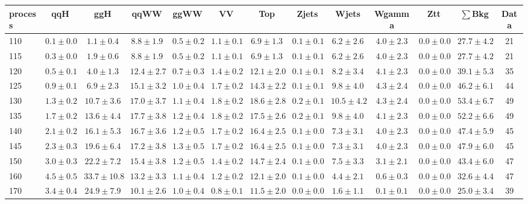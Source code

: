 \begin{table}
{%
 \tiny
 \begin{center}
 \begin{tabular}{l | c c | c c c c c c c c  | c c}
 \hline
 process & qqH & ggH & qqWW & ggWW & VV & Top & Zjets & Wjets & Wgamma & Ztt & $\sum$Bkg & Data \\
 \hline
110 & $0.1\pm0.0$ & $1.1\pm0.4$ & $8.8\pm1.9$ & $0.5\pm0.2$ & $1.1\pm0.1$ & $6.9\pm1.3$ & $0.1\pm0.1$ & $6.2\pm2.6$ & $4.0\pm2.3$ & $0.0\pm0.0$ & $27.7\pm4.2$ & 21 \\
115 & $0.3\pm0.0$ & $1.9\pm0.6$ & $8.8\pm1.9$ & $0.5\pm0.2$ & $1.1\pm0.1$ & $6.9\pm1.3$ & $0.1\pm0.1$ & $6.2\pm2.6$ & $4.0\pm2.3$ & $0.0\pm0.0$ & $27.7\pm4.2$ & 21 \\
120 & $0.5\pm0.1$ & $4.0\pm1.3$ & $12.4\pm2.7$ & $0.7\pm0.3$ & $1.4\pm0.2$ & $12.1\pm2.0$ & $0.1\pm0.1$ & $8.2\pm3.4$ & $4.1\pm2.3$ & $0.0\pm0.0$ & $39.1\pm5.3$ & 35 \\
125 & $0.9\pm0.1$ & $6.9\pm2.3$ & $15.1\pm3.2$ & $1.0\pm0.4$ & $1.7\pm0.2$ & $14.3\pm2.2$ & $0.1\pm0.1$ & $9.8\pm4.0$ & $4.3\pm2.4$ & $0.0\pm0.0$ & $46.2\pm6.1$ & 44 \\
130 & $1.3\pm0.2$ & $10.7\pm3.6$ & $17.0\pm3.7$ & $1.1\pm0.4$ & $1.8\pm0.2$ & $18.6\pm2.8$ & $0.2\pm0.1$ & $10.5\pm4.2$ & $4.3\pm2.4$ & $0.0\pm0.0$ & $53.4\pm6.7$ & 49 \\
135 & $1.7\pm0.2$ & $13.6\pm4.4$ & $17.7\pm3.8$ & $1.2\pm0.4$ & $1.8\pm0.2$ & $17.5\pm2.6$ & $0.2\pm0.1$ & $9.8\pm4.0$ & $4.1\pm2.3$ & $0.0\pm0.0$ & $52.2\pm6.6$ & 49 \\
140 & $2.1\pm0.2$ & $16.1\pm5.3$ & $16.7\pm3.6$ & $1.2\pm0.5$ & $1.7\pm0.2$ & $16.4\pm2.5$ & $0.1\pm0.0$ & $7.3\pm3.1$ & $4.0\pm2.3$ & $0.0\pm0.0$ & $47.4\pm5.9$ & 45 \\
145 & $2.3\pm0.3$ & $19.6\pm6.4$ & $17.2\pm3.8$ & $1.3\pm0.5$ & $1.7\pm0.2$ & $16.4\pm2.5$ & $0.1\pm0.0$ & $7.3\pm3.1$ & $4.0\pm2.3$ & $0.0\pm0.0$ & $47.9\pm6.0$ & 45 \\
150 & $3.0\pm0.3$ & $22.2\pm7.2$ & $15.4\pm3.8$ & $1.2\pm0.5$ & $1.4\pm0.2$ & $14.7\pm2.4$ & $0.1\pm0.0$ & $7.5\pm3.3$ & $3.1\pm2.1$ & $0.0\pm0.0$ & $43.4\pm6.0$ & 47 \\
160 & $4.5\pm0.5$ & $33.7\pm10.8$ & $13.2\pm3.3$ & $1.1\pm0.4$ & $1.2\pm0.2$ & $12.1\pm2.0$ & $0.1\pm0.0$ & $4.4\pm2.1$ & $0.6\pm0.3$ & $0.0\pm0.0$ & $32.6\pm4.4$ & 47 \\
170 & $3.4\pm0.4$ & $24.9\pm7.9$ & $10.1\pm2.6$ & $1.0\pm0.4$ & $0.8\pm0.1$ & $11.5\pm2.0$ & $0.0\pm0.0$ & $1.6\pm1.1$ & $0.1\pm0.1$ & $0.0\pm0.0$ & $25.0\pm3.4$ & 39 \\

\end{tabular}
\end{center}}
\end{table}
